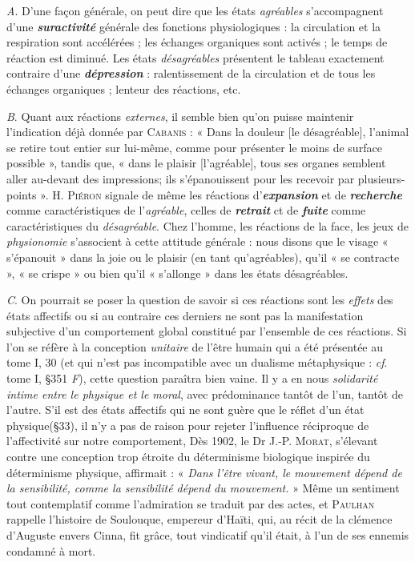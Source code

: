 {\it A}. D’une façon générale, on
peut dire que les états {\it agréables} s’accompagnent d’une \textbf{\textit {suractivité}}
générale des fonctions physiologiques : la circulation et la respiration
sont accélérées ; les échanges organiques sont activés ; le temps de
réaction est diminué. Les états {\it désagréables} présentent le tableau
exactement contraire d’une \textbf{\textit {dépression}} : ralentissement de la circulation
et de tous les échanges organiques ; lenteur des réactions, etc.

{\it B}. Quant aux réactions {\it externes}, il semble bien qu’on puisse maintenir
l'indication déjà donnée par \textsc{Cabanis} : « Dans la douleur [le désagréable],
l’animal se retire tout entier sur lui-même, comme pour
présenter le moins de surface possible », tandis que, « dans le plaisir
[l’agréable], tous ses organes semblent aller au-devant des impressions;
ils s’épanouissent pour les recevoir par plusieurs-points ». H. \textsc{Piéron}
signale de même les réactions d'\textbf{\textit {expansion}} et de
\textbf{\textit {recherche}} comme
caractéristiques de l’{\it agréable}, celles de \textbf{\textit {retrait}} ct de
\textbf{\textit {fuite}} comme caractéristiques
du {\it désagréable}. Chez l’homme, les réactions de la face,
les jeux de {\it physionomie} s'associent à cette attitude générale : nous
disons que le visage « s’épanouit » dans la joie ou le plaisir (en tant
qu’agréables), qu'il « se contracte », « se crispe » ou bien qu’il « s’allonge »
dans les états désagréables.

{\it C}. On pourrait se poser la question de savoir si ces réactions sont
les {\it effets} des états affectifs ou si au contraire ces derniers ne sont pas
la manifestation subjective d’un comportement global constitué par
l’ensemble de ces réactions. Si l’on se réfère à la conception {\it unitaire}
de l’être humain qui a été présentée au tome I, 30 (et qui n’est pas
incompatible avec un dualisme métaphysique : {\it cf}. tome I, \S 351 {\it F}),
cette question paraîtra bien vaine. Il y a en nous {\it solidarité intime
entre le physique et le moral}, avec prédominance tantôt de l’un, tantôt
de l’autre. S'il est des états affectifs qui ne sont guère que le réflet
d’un état physique(\S 33), il n’y a pas de raison pour rejeter l’influence
réciproque de l’affectivité sur notre comportement, Dès 1902, le
Dr J.-P. \textsc{Morat}, s’élevant contre une conception trop étroite du
déterminisme biologique inspirée du déterminisme physique, affirmait :
« {\it Dans l'être vivant, le mouvement dépend de la sensibilité,
comme la sensibilité dépend du mouvement.} » Même un sentiment tout
contemplatif comme l'admiration se traduit par des actes, et
\textsc{Paulhan} rappelle l’histoire de Soulouque, empereur d'Haïti, qui,
au récit de la clémence d’Auguste envers Cinna, fit grâce, tout
vindicatif qu’il était, à l’un de ses ennemis condamné à mort.

